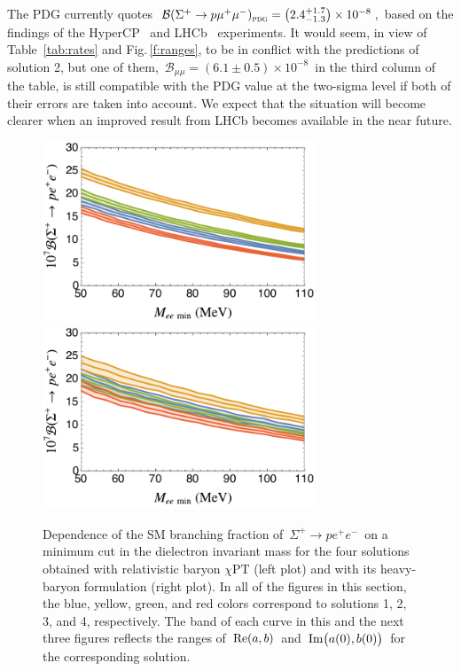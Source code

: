 \documentclass[amsmath,amssymb,aps,nofootinbib,prd,preprint,superscriptaddress,tightenlines,a4paper,bm]{revtex4-2}
\begin{document}
The PDG \cite{Workman:2022ynf} currently quotes \,${\cal B}(\Sigma^+\to p\mu^+\mu^-)_{\textsc{pdg}}^{} = \big(2.4^{+1.7}_{-1.3}\big)\times 10^{-8}$,\, based on the findings of the HyperCP~\cite
{HyperCP:2005mvo} and LHCb~\cite
{LHCb:2017rdd} experiments.
It would seem, in view of Table~\ref{tab:rates} and Fig.\,\ref{f:ranges}, to be in conflict with the predictions of solution 2, but one of them, \,${\mathscr B}_{\mu\mu}=(6.1\pm0.5)\times10^{-8}$\, in the third column of the table, is still compatible with the PDG value at the two-sigma level if both of their errors are taken into account.
We expect that the situation will become clearer when an improved result from LHCb becomes available in the near future.

\begin{figure}[b] \bigskip
\includegraphics[width=3.2in]{Bee_cut.pdf} ~ \includegraphics[width=3.2in]{Bee_NR_cut.pdf} \vspace{-1ex}
\caption{Dependence of the SM branching fraction of \,$\Sigma^+\to p e^+e^-$\, on a minimum cut in the dielectron invariant mass for the four solutions obtained with relativistic baryon $\chi$PT (left plot) and with its heavy-baryon formulation (right plot).
In all of the figures in this section, the blue, yellow, green, and red colors correspond to solutions 1, 2, 3, and 4, respectively.
The band of each curve in this and the next three figures reflects the ranges of \,${\rm Re}(a,b)$\, and \,${\rm Im}\big(a(0),b(0)\big)$\, for the corresponding solution.} \label{f:beecut}
\end{figure}
\end{document}
